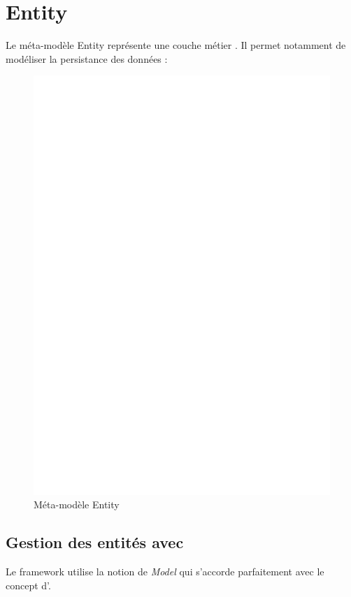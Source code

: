 \section{Entity}\label{sub:ent}
Le méta-modèle Entity représente une couche \og métier \fg{}. Il permet notamment de modéliser la persistance des données :  

\begin{figure}[htb]
  \centering
  \includegraphics[scale=.4]{img/Entity.eps}
  \caption{Méta-modèle Entity}
  \label{fig:ent}
\end{figure}



\subsection{Gestion des entités avec \kwplay{}}
Le framework \kwplay{} utilise la notion de \textit{Model} qui s'accorde parfaitement avec le concept d'\kwentity{}. 

